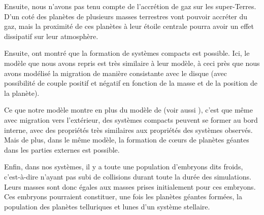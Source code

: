Ensuite, nous n'avons pas tenu compte de l'accrétion de gaz sur les super-Terres. D'un coté des planètes de plusieurs masses terrestres vont pouvoir accréter du gaz, mais la proximité de ces planètes à leur étoile centrale pourra avoir un effet dissipatif sur leur atmosphère. 

Ensuite, \cite{terquem2007migration} ont montré que la formation de systèmes compacts est possible. Ici, le modèle que nous avons repris est très similaire à leur modèle, à ceci près que nous avons modélisé la migration de manière consistante avec le disque (avec possibilité de couple positif et négatif en fonction de la masse et de la position de la planète). 

Ce que notre modèle montre en plus du modèle de \cite{terquem2007migration} (voir aussi \cite{ogihara2007accretion,
cresswell2008three}), c'est que même avec migration vers l'extérieur, des systèmes compacts peuvent se former au bord interne,
avec des propriétés très similaires aux propriétés des systèmes observés. Mais de plus, dans le même modèle, la formation de
cœurs de planètes géantes dans les parties externes est possible. 

\bigskip

Enfin, dans nos systèmes, il y a toute une population d'embryons dits froids, c'est-à-dire n'ayant pas subi de collisions durant toute la durée des simulations. Leurs masses sont donc égales aux masses prises initialement pour ces embryons. Ces embryons pourraient constituer, une fois les planètes géantes formées, la population des planètes telluriques et lunes d'un système stellaire. 
